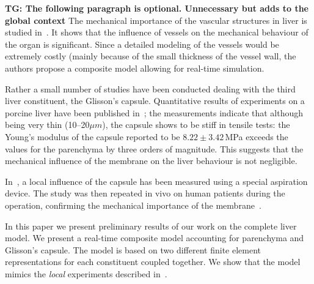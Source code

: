 \documentclass{acm_proc_article-sp}
\newcommand{\TG}[1]{{\color{blue}\textbf{TG: #1}}}
\begin{document}
\TG{The following paragraph is optional. Unnecessary but adds to the global context}
The mechanical importance of the vascular structures in liver is studied in~\cite{Peterlik2012}. It shows that the 
influence of vessels on the mechanical behaviour of the organ is significant. %
Since a detailed modeling of the vessels would be extremely costly (mainly because of the small thickness of the vessel wall, 
the authors propose a composite model allowing for real-time simulation.


Rather a small number of studies have been conducted dealing with the third liver constituent, the  Glisson's capsule.
Quantitative results of experiments on a porcine liver have been published in~\cite{Umale2011}; the measurements indicate that although being very 
thin (10--20$\mu m$), the capsule shows to be stiff in tensile tests: the Young's modulus of the capsule reported to be $8.22\pm3.42$\,MPa 
exceeds the values for the parenchyma by three orders of magnitude.
This suggests that the mechanical influence of the membrane on the liver behaviour is not negligible.

In~\cite{Hollenstein2006}, a local influence of the capsule has been measured using a special aspiration device. The study was then repeated 
in vivo on human patients during the operation, confirming the mechanical importance of the membrane~\cite{Ahn2010,Nava2008}.

In this paper we present preliminary results of our work on the complete liver
model. We present a real-time composite model accounting for parenchyma and
Glisson's capsule. The model is based on two different finite element
representations for each constituent coupled together.
We show that the model mimics the \emph{local} experiments described in~\cite{Hollenstein2006}.
 
\end{document}

